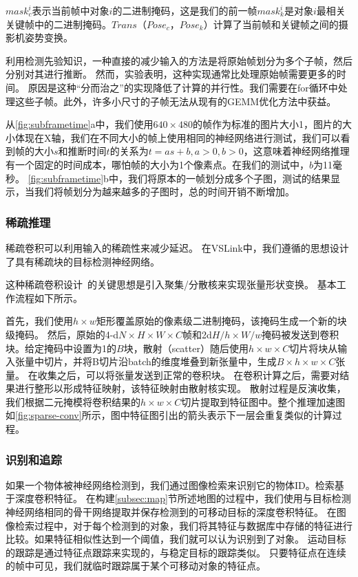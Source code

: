 $mask_c^i$表示当前帧中对象$i$的二进制掩码，这是我们的前一帧$mask_k^i$是对象$i$最相关关键帧中的二进制掩码。$Trans（Pose_c，Pose_k）$计算了当前帧和关键帧之间的摄影机姿势变换。

利用检测先验知识，一种直接的减少输入的方法是将原始帧划分为多个子帧，然后分别对其进行推断。
然而，实验表明，这种实现通常比处理原始帧需要更多的时间。
原因是这种“分而治之”的实现降低了计算的并行性。我们需要在for循环中处理这些子帧。此外，许多小尺寸的子帧无法从现有的GEMM优化方法中获益。

从\autoref{fig:subframetime}a中，我们使用$640\times 480$的帧作为标准的图片大小1，图片的大小体现在X轴，我们在不同大小的帧上使用相同的神经网络进行测试，我们可以看到帧的大小$s$和推断时间$t$的关系为$t = as + b, a>0,b >0$，这意味着神经网络推理有一个固定的时间成本，哪怕帧的大小为1个像素点。在我们的测试中，$b$为11毫秒。
\autoref{fig:subframetime}b中，我们将原本的一帧划分成多个子图，测试的结果显示，当我们将帧划分为越来越多的子图时，总的时间开销不断增加。
 
\subsubsection{\textbf{稀疏推理}}
稀疏卷积\cite{graham2015sparse,ren2018sbnet}可以利用输入的稀疏性来减少延迟。
在VSLink中，我们遵循\cite{ren2018sbnet}的思想设计了具有稀疏块的目标检测神经网络。

这种稀疏卷积设计~\cite{ren2018sbnet}的关键思想是引入聚集/分散核来实现张量形状变换。
基本工作流程如下所示。

首先，我们使用$h\times w$矩形覆盖原始的像素级二进制掩码，该掩码生成一个新的块级掩码。
然后，原始的4-d$N \times H \times W \times C$帧和2d$H/h \times W/w$掩码被发送到卷积块。给定掩码中设置为1的$B$块，散射（scatter）随后使用$h\times w \times C$切片将块从输入张量中切片，并将B切片沿batch的维度堆叠到新张量中，生成$B\times h \times w \times C$张量。
在收集之后，可以将张量发送到正常的卷积块。
在卷积计算之后，需要对结果进行整形以形成特征映射，该特征映射由散射核实现。
散射过程是反演收集，我们根据二元掩模将卷积结果的$h\times w \times C$切片提取到特征图中。整个推理加速图如\autoref{fig:sparse-conv}所示，图中特征图引出的箭头表示下一层会重复类似的计算过程。


\subsubsection{\textbf{识别和追踪}}
如果一个物体被神经网络检测到，我们通过图像检索来识别它的物体ID。检索基于深度卷积特征。
在构建\ref{subsec:map}节所述地图的过程中，我们使用与目标检测神经网络相同的骨干网络提取并保存检测到的可移动目标的深度卷积特征。
在图像检索过程中，对于每个检测到的对象，我们将其特征与数据库中存储的特征进行比较。如果特征相似性达到一个阈值，我们就可以认为识别到了对象。
运动目标的跟踪是通过特征点跟踪来实现的，与稳定目标的跟踪类似。
只要特征点在连续的帧中可见，我们就临时跟踪属于某个可移动对象的特征点。

